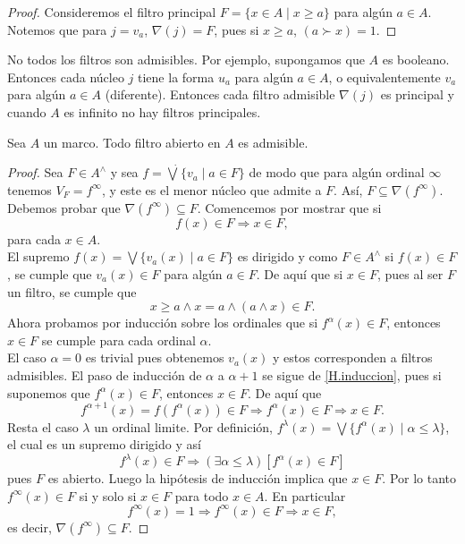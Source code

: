 \begin{proof}
    Consideremos el filtro principal $F=\{x\in A\mid x\geq a\}$ para algún $a\in A$. Notemos que para $j=v_a$, $\nabla(j)=F$, pues si $x\geq a$, $(a\succ x)=1$. 
\end{proof}

No todos los filtros son admisibles. Por ejemplo, supongamos que $A$ es booleano. Entonces cada núcleo $j$ tiene la forma $u_a$ para algún $a\in A$, o equivalentemente $v_a$ para algún $a\in A$ (diferente). Entonces cada filtro admisible $\nabla(j)$ es principal y cuando $A$ es infinito no hay filtros principales.

\begin{lem}\label{Lema5.5.4}
    Sea $A$ un marco. Todo filtro abierto en $A$ es admisible.
\end{lem}

\begin{proof}
    Sea $F\in A^{\wedge}$ y sea $f=\dot{\bigvee}\{v_a\mid a\in F\}$ de modo que para algún ordinal $\infty$ tenemos $V_F=f^\infty$, y este es el menor núcleo que admite a $F$. Así, $F\subseteq \nabla(f^\infty)$. Debemos probar que $\nabla(f^\infty)\subseteq F$. Comencemos por mostrar que si 
    \begin{equation}\label{H.induccion}
        f(x)\in F \Rightarrow x\in F,
    \end{equation}
    para cada $x\in A$.\\

    El supremo $f(x)=\bigvee\{v_a(x)\mid a\in F\}$ es dirigido y como $F\in A^\wedge$ si $f(x)\in F$, se cumple que $v_a(x)\in F$ para algún $a\in F$. De aquí que si $x\in F$, pues al ser $F$ un filtro, se cumple que 
    \[
    x\geq a\wedge x=a\wedge (a\wedge x)\in F.
    \]
    Ahora probamos por inducción sobre los ordinales que si $f^\alpha(x)\in F$, entonces $x\in F$ se cumple para cada ordinal $\alpha$.\\

    El caso $\alpha =0$ es trivial pues obtenemos $v_a(x)$ y estos corresponden a filtros admisibles. El paso de inducción de $\alpha$ a $\alpha +1$ se sigue de \ref{H.induccion}, pues si suponemos que $f^\alpha (x)\in F$, entonces $x\in F$. De aquí que 
    \[
    f^{\alpha +1}(x)=f(f^\alpha(x))\in F\Rightarrow f^\alpha(x)\in F\Rightarrow x\in F.
    \]
    Resta el caso $\lambda$ un ordinal limite. Por definición, $f^\lambda (x)=\bigvee\{f^\alpha(x)\mid \alpha\leq \lambda\}$, el cual es un supremo dirigido y así
    \[
    f^\lambda(x)\in F\Rightarrow (\exists \alpha \leq \lambda )[f^\alpha (x)\in F]
    \]
    pues $F$ es abierto. Luego la hipótesis de inducción implica que $x\in F$. Por lo tanto $f^\infty (x)\in F$ si y solo si $x\in F$ para todo $x\in A$. En particular 
    \[
    f^\infty (x)=1\Rightarrow f^\infty (x)\in F\Rightarrow x\in F,
    \]
    es decir, $\nabla(f^\infty )\subseteq F$. 
\end{proof}

